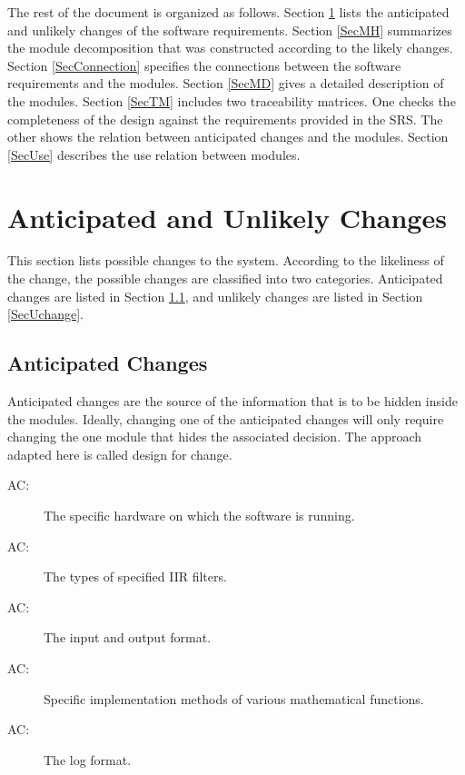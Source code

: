 \documentclass[12pt, titlepage]{article}
\newcounter{acnum}
\newcommand{\actheacnum}{AC\theacnum}
\begin{document}
The rest of the document is organized as follows. Section \ref{SecChange} lists
the anticipated and unlikely changes of the software requirements. Section
\ref{SecMH} summarizes the module decomposition that was constructed according
to the likely changes. Section \ref{SecConnection} specifies the connections
between the software requirements and the modules. Section \ref{SecMD} gives a
detailed description of the modules. Section \ref{SecTM} includes two
traceability matrices. One checks the completeness of the design against the
requirements provided in the SRS. The other shows the relation between
anticipated changes and the modules. Section \ref{SecUse} describes the use
relation between modules.

\section{Anticipated and Unlikely Changes} \label{SecChange}

This section lists possible changes to the system. According to the likeliness
of the change, the possible changes are classified into two categories.
Anticipated changes are listed in Section \ref{SecAchange}, and unlikely changes
are listed in Section \ref{SecUchange}.

\subsection{Anticipated Changes} \label{SecAchange}

Anticipated changes are the source of the information that is to be hidden
inside the modules. Ideally, changing one of the anticipated changes will only
require changing the one module that hides the associated decision. The approach
adapted here is called design for change.

\begin{description}
\item[ \actheacnum \label{acHardware}:] The specific
hardware on which the software is running.
\item[ \actheacnum \label{acSIIR}:] The types of specified
IIR filters.
\item[ \actheacnum \label{acIO}:] The input and output
format.
\item[ \actheacnum \label{acMath}:] Specific
implementation methods of various mathematical functions.
\item[ \actheacnum \label{acLog}:] The log format.
\end{description}
\end{document}
